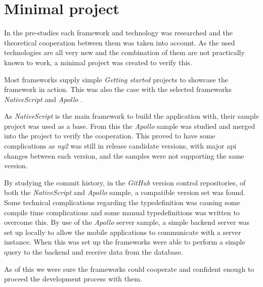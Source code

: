 \chapter{Minimal project}
In the pre-studies each framework and technology was researched and the theoretical cooperation between them was taken into account.
As the used technologies are all very new and the combination of them are not practically known to work, a minimal project was created to verify this.

Most frameworks supply simple \textit{Getting started} projects to showcase the framework in action.
This was also the case with the selected frameworks \textit{NativeScript} \citep{minimalProject:sample:nativescript} and \textit{Apollo} \citep{minimalProject:sample:apollo}.

As \textit{NativeScript} is the main framework to build the application with, their sample project was used as a base.
From this the \textit{Apollo} sample was studied and merged into the project to verify the cooperation.
This proved to have some complications as \textit{\gls{ng2}} was still in release candidate versions, with major \gls{api} changes between each version, and the samples were not supporting the same version.

By studying the commit history, in the \textit{GitHub} version control repositories, of both the \textit{NativeScript} and \textit{Apollo} sample, a compatible version set was found.
Some technical complications regarding the \gls{typedefinition} was causing some compile time complications and some manual \glspl{typedefinition} was written to overcome this.
By use of the \textit{Apollo} server sample, a simple backend server was set up locally to allow the mobile applications to communicate with a server instance.
When this was set up the frameworks were able to perform a simple query to the backend and receive data from the database.

As of this we were sure the frameworks could cooperate and confident enough to proceed the development process with them.
